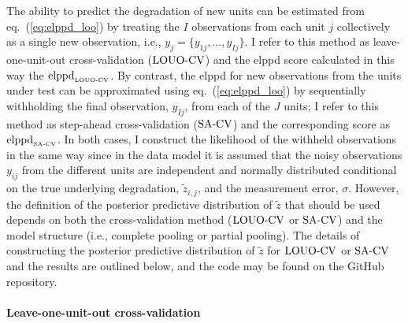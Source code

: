 The ability to predict the degradation of new units can be estimated from eq.~(\ref{eq:elppd_loo}) by treating the $I$ observations from each unit $j$ collectively as a single new observation, i.e., $y_j = \{y_{1j}, \ldots, y_{Ij}\}$. I refer to this method as leave-one-unit-out cross-validation ($\hbox{LOUO-CV}$) and the elppd score calculated in this way the $\hbox{elppd}_{\hbox{\tiny{LOUO-CV}}}$. By contrast, the elppd for new observations from the units under test can be approximated using eq.~(\ref{eq:elppd_loo}) by sequentially withholding the final observation, $y_{Ij}$, from each of the $J$ units; I refer to this method as step-ahead cross-validation ($\hbox{SA-CV}$) and the corresponding score as $\hbox{elppd}_{\hbox{\tiny{SA-CV}}}$. In both cases, I construct the likelihood of the withheld observations in the same way since in the data model it is assumed that the noisy observations $y_{ij}$ from the different units are independent and normally distributed conditional on the true underlying degradation, $\tilde{z}_{i, j}$, and the measurement error, $\sigma$. However, the definition of the posterior predictive distribution of $\tilde{z}$ that should be used depends on both the cross-validation method ($\hbox{LOUO-CV}$ or $\hbox{SA-CV}$) and the model structure (i.e., complete pooling or partial pooling). The details of constructing the posterior predictive distribution of $\tilde{z}$ for $\hbox{LOUO-CV}$ or $\hbox{SA-CV}$ and the results are outlined below, and the code may be found on the GitHub repository.



\paragraph{Leave-one-unit-out cross-validation} 

